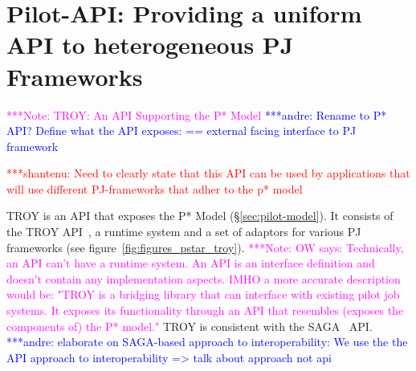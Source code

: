 \documentclass[conference,final]{IEEEtran}
\newcommand{\terminology}[1]{ {\textcolor{red} {(Terminology used: \textbf{#1}) }}}
\newcommand{\jhanote}[1]{ {\textcolor{red} { ***shantenu: #1 }}}
\newcommand{\alnote}[1]{ {\textcolor{blue} { ***andre: #1 }}}
\newcommand{\amnote}[1]{ {\textcolor{blue} { ***andre2: #1 }}}
\newcommand{\msnote}[1]{ {\textcolor{cyan} { ***mark: #1 }}}
\newcommand{\note}[1]{ {\textcolor{magenta} { ***Note: #1 }}}
\newcommand{\terminology}[1]{}
\newcommand{\alnote}[1]{}
\newcommand{\amnote}[1]{}
\newcommand{\jhanote}[1]{}
\newcommand{\msnote}[1]{}
\newcommand{\note}[1]{}
\newcommand{\cu}{CU\xspace}
\newcommand{\upp}{\vspace*{-0.5em}}
\begin{document}
\upp

\section{Pilot-API: Providing a uniform API to heterogeneous PJ Frameworks}
\note{TROY: An API Supporting the P* Model} \alnote{Rename to P* API?
  Define what the API exposes: == external facing interface to PJ
  framework}

\jhanote{Need to clearly state that this API can be used by
  applications that will use different PJ-frameworks that adher to the
  p* model}
  






TROY is an API that exposes the P* Model
(\S\ref{sec:pilot-model}). It consists of the TROY
API~\cite{troy_api}, a runtime system and a set of adaptors for
various PJ frameworks (see figure~\ref{fig:figures_pstar_troy}). 
\note{OW says: Technically, an API can't have a runtime system.
An API is an interface definition and doesn't contain any implementation aspects.
IMHO a more accurate description would be: "TROY is a bridging library that can
interface with existing pilot job systems. It exposes its functionality 
through an API that resembles (exposes the components of) the P* model."}
TROY is consistent with the SAGA~\cite{saga_url,saga_gfd90} API. 
\alnote{elaborate on SAGA-based approach to interoperability: We use the the API 
approach to interoperability => talk about approach not api}
\end{document}
